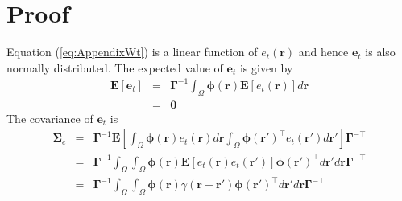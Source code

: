 \documentclass[12pt]{iopart}
\begin{document}
\section*{Proof} Equation (\ref{eq:AppendixWt}) is a linear function of $e_t(\mathbf r)$ and hence $\mathbf{e}_t$ is also normally distributed. The expected value of $\mathbf e_t$ is given by 
\begin{eqnarray}
	\mathbf E\left[ \mathbf e_t\right]&=& \mathbf{\Gamma}^{-1}\int_{\Omega}\boldsymbol\phi\left(\mathbf{r}\right)\mathbf E\left[e_t\left(\mathbf{r}\right)\right] d\mathbf{r} \nonumber \\
	&=&\mathbf 0 
\end{eqnarray}
The covariance of $\mathbf{e}_t$ is 
\begin{eqnarray}
	\mathbf{\Sigma}_e&=&\mathbf{\Gamma}^{-1}\mathbf E[\int_{\Omega}\boldsymbol{\phi}\left(\mathbf{r}\right)e_t\left(\mathbf{r}\right)d\mathbf{r} \int_{\Omega}\boldsymbol{\phi}\left(\mathbf{r}'\right)^{\top} e_t\left(\mathbf{r}'\right)d\mathbf{r}']\mathbf{\Gamma}^{- \top} \nonumber \\
	&=&\mathbf{\Gamma}^{-1}\int_{\Omega}\int_{\Omega} \boldsymbol{\phi}\left(\mathbf{r}\right) \mathbf E[e_t\left(\mathbf{r}\right)e_t\left(\mathbf{r}'\right)]\boldsymbol{\phi}\left(\mathbf{r}'\right)^{\top}d\mathbf{r}' d\mathbf r\mathbf{\Gamma}^{- \top} \nonumber\\
	&=&\mathbf{\Gamma}^{-1}\int_{\Omega}\int_{\Omega}\boldsymbol{\phi}\left(\mathbf r\right) \gamma\left(\mathbf r- \mathbf r' \right)\boldsymbol{\phi}\left(\mathbf r'\right)^{\top}d\mathbf r' d\mathbf r\mathbf{\Gamma}^{- \top} 
\end{eqnarray}
\end{document}
